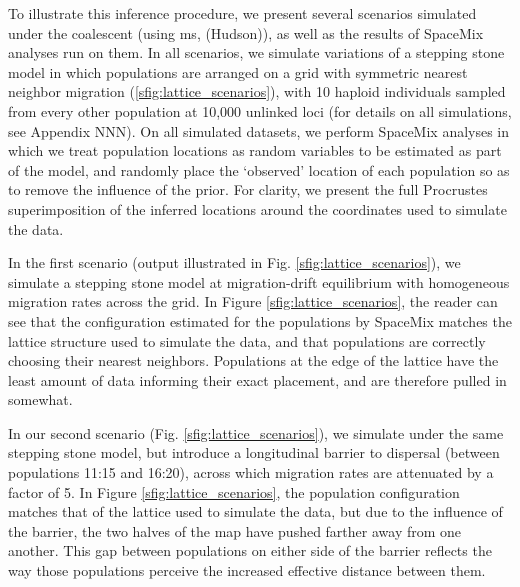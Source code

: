 \documentclass[12pt]{article}
\newcommand{\gb}[1]{{\em \color{magenta} #1}}
\begin{document}

To illustrate this inference procedure, we present several scenarios simulated under the coalescent (using \textrm{ms}, (Hudson)), as well as the results of SpaceMix analyses run on them.  In all scenarios, we simulate variations of a stepping stone model in which populations are arranged on a grid with symmetric nearest neighbor migration (\ref{sfig:lattice_scenarios}), with 10 haploid individuals sampled from every other population at 10,000 unlinked loci (for details on all simulations, see Appendix NNN). On all simulated datasets, we perform SpaceMix analyses in which we treat population locations as random variables to be estimated as part of the model, and randomly place the `observed' location of each population so as to remove the influence of the prior.  For clarity, we present the full Procrustes superimposition of the inferred locations around the coordinates used to simulate the data.

In the first scenario (output illustrated in Fig. \ref{sfig:lattice_scenarios}), we simulate a stepping stone model at migration-drift equilibrium with homogeneous migration rates across the grid. In Figure \ref{sfig:lattice_scenarios}, the reader can see that the configuration estimated for the populations by SpaceMix matches the lattice structure used to simulate the data, and that populations are correctly choosing their nearest neighbors.  Populations at the edge of the lattice have the least amount of data informing their exact placement, and are therefore pulled in somewhat.

In our second scenario (Fig. \ref{sfig:lattice_scenarios}), we simulate under the same stepping stone model, but introduce a longitudinal barrier to dispersal (between populations 11:15 and 16:20), across which migration rates are attenuated by a factor of 5.  In Figure \ref{sfig:lattice_scenarios}, the population configuration matches that of the lattice used to simulate the data, but due to the influence of the barrier, the two halves of the map have pushed farther away from one another.  This gap between populations on either side of the barrier reflects the way those populations perceive the increased effective distance between them.
\end{document}
